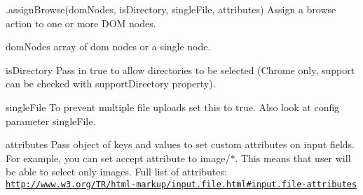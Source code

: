 \begin{DoxyItemize}
\item {\ttfamily .assign\+Browse(dom\+Nodes, is\+Directory, single\+File, attributes)} Assign a browse action to one or more D\+OM nodes.
\begin{DoxyItemize}
\item {\ttfamily dom\+Nodes} array of dom nodes or a single node.
\item {\ttfamily is\+Directory} Pass in {\ttfamily true} to allow directories to be selected (Chrome only, support can be checked with {\ttfamily support\+Directory} property).
\item {\ttfamily single\+File} To prevent multiple file uploads set this to true. Also look at config parameter {\ttfamily single\+File}.
\item {\ttfamily attributes} Pass object of keys and values to set custom attributes on input fields. For example, you can set {\ttfamily accept} attribute to {\ttfamily image/$\ast$}. This means that user will be able to select only images. Full list of attributes\+: \href{http://www.w3.org/TR/html-markup/input.file.html#input.file-attributes}{\tt http\+://www.\+w3.\+org/\+T\+R/html-\/markup/input.\+file.\+html\#input.\+file-\/attributes}


\end{DoxyItemize}
\end{DoxyItemize}
